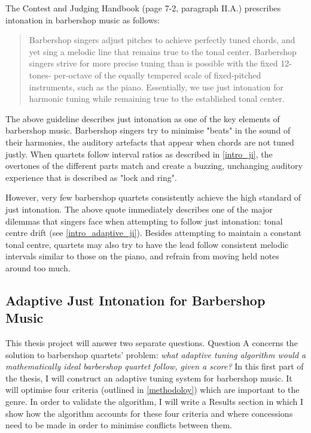 \documentclass[a4paper]{article}
\begin{document}
The Contest and Judging Handbook (page 7-2, paragraph II.A.) prescribes intonation in barbershop music as follows:
\begin{quote}
	Barbershop singers adjust pitches to achieve perfectly tuned chords, and yet sing a melodic line that remains true to the tonal center. Barbershop singers strive for more precise tuning than is possible with the fixed 12-tones- per-octave of the equally tempered scale of fixed-pitched instruments, such as the piano. Essentially, we use just intonation for harmonic tuning while remaining true to the established tonal center.\cite{barbershop_harmony_society_contest_2022}
\end{quote}
The above guideline describes just intonation as one of the key elements of barbershop music. Barbershop singers try to minimise "beats" in the sound of their harmonies, the auditory artefacts that appear when chords are not tuned justly. When quartets follow interval ratios as described in \ref{intro_ji}, the overtones of the different parts match and create a buzzing, unchanging auditory experience that is described as "lock and ring".

However, very few barbershop quartets consistently achieve the high standard of just intonation.\cite{garnett_ethics_1999} The above quote immediately describes one of the major dilemmas that singers face when attempting to follow just intonation: tonal centre drift (see \ref{intro_adaptive_ji}). Besides attempting to maintain a constant tonal centre, quartets may also try to have the lead follow consistent melodic intervals similar to those on the piano, and refrain from moving held notes around too much.

\subsection{Adaptive Just Intonation for Barbershop Music}
\label{intro_aji_for_bs}
This thesis project will answer two separate questions. Question A concerns the solution to barbershop quartets' problem: {\it what adaptive tuning algorithm would a mathematically ideal barbershop quartet follow, given a score?} In this first part of the thesis, I will construct an adaptive tuning system for barbershop music. It will optimise four criteria (outlined in \ref{methodoloy}) which are important to the genre. In order to validate the algorithm, I will write a Results section in which I show how the algorithm accounts for these four criteria and where concessions need to be made in order to minimise conflicts between them.
\end{document}
